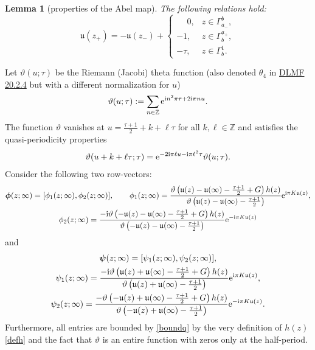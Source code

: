 \documentclass[10pt,a4paper]{amsart}
\numberwithin{equation}{section}
\newtheorem{Lemma}[Theorem]{Lemma}
\theoremstyle{definition}
\def\Abel{\mathfrak u}
\def\le{\left}
\def \bs{\boldsymbol}
\def\ri{\right}
\def\nn{\nonumber}
\def\be{\begin{equation}}
\def\ee{\end{equation}}
\def\Z{{\mathbb Z}}
\begin{document}
\begin{Lemma}[properties of the Abel map]\label{lemmaAbel}
The following relations hold:
\[
\Abel(z_+)=-\Abel(z_-) +
\begin{cases}
\phantom{-}0,& z\in \Gamma_{a_-}^b,\\
-1,& z\in \Gamma_b^{a_+},\\
-\tau, & z\in \Gamma_b^1.
\end{cases}
\]
\end{Lemma}
Let $\vartheta(u;\tau)$ be the Riemann (Jacobi) theta function (also denoted $\theta_4$ in \href{https://dlmf.nist.gov/20.2.E4}{DLMF 20.2.4} but with a different normalization for $u$)
\[
\vartheta(u;\tau) := \sum_{n\in \Z} {\rm e}^{{\rm i}n^2\pi \tau + 2{\rm i}\pi n u}.
\]
The function $\vartheta$ vanishes at $u = \frac {\tau + 1}2 + k + \ell \tau$ for all $k, \ell\in \Z$ and satisfies the quasi-periodicity properties
\be
\vartheta(u+k+ \ell \tau;\tau) = {\rm e}^{-2{\rm i}\pi \ell u - {\rm i}\pi \ell^2 \tau}\vartheta(u;\tau).
\label{thetaperiods}
\ee
Consider the following two row-vectors:
\begin{gather}
\bs \phi (z;\infty)= [\phi_1(z;\infty), \phi_2(z;\infty)],\qquad
\phi_1(z;\infty)= \frac { \vartheta\le(\Abel(z)-\Abel(\infty) - \frac {\tau+1}2 +
G\ri)h(z)}{\vartheta\le(\Abel(z)-\Abel(\infty) - \frac{\tau+1}2\ri)}{\rm e}^{{\rm i}\pi K \Abel(z)},
\nonumber\\
\phi_2(z;\infty)= \frac {-{\rm i} \vartheta\le(-\Abel(z)-\Abel(\infty) - \frac {\tau+1}2 +
G\ri)h(z)}{\vartheta\le(-\Abel(z)-\Abel(\infty) - \frac{\tau+1}2\ri)}{\rm e}^{-{\rm i}\pi K \Abel(z)}
\label{rowphi}
\end{gather}
and
\begin{gather}
\bs\psi(z;\infty) = [\psi_1(z;\infty), \psi_2(z;\infty)],\nn\\
\psi_1(z;\infty) = \frac {-{\rm i} \vartheta\le(\Abel(z)+\Abel(\infty) - \frac {\tau+1}2 +
G\ri)h(z)}{\vartheta\le(\Abel(z)+\Abel(\infty) - \frac{\tau+1}2\ri)}{\rm e}^{{\rm i}\pi K \Abel(z)},
\nn\\
\psi_2(z;\infty) = \frac { -\vartheta\le(-\Abel(z)+\Abel(\infty) - \frac {\tau+1}2 +
G\ri)h(z)}{\vartheta\le(-\Abel(z)+\Abel(\infty) - \frac{\tau+1}2\ri)}{\rm e}^{-{\rm i}\pi K \Abel(z)}.
\label{rowpsi}
\end{gather}
Furthermore, all entries are bounded by \eqref{boundq} by the very definition of $h(z)$ \eqref{defh} and the fact that $\vartheta$ is an entire function with zeros only at the half-period.
\end{document}

